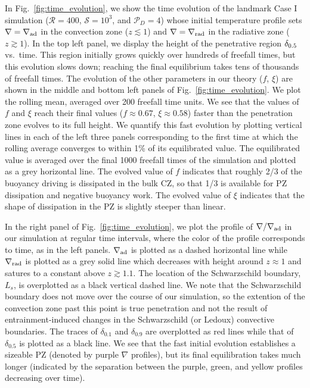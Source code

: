 \documentclass[twocolumn]{aastex631}
\newcommand{\gradrad}{\ensuremath{\nabla_{\rm{rad}}}}
\newcommand{\gradad}{\ensuremath{\nabla_{\rm{ad}}}}
\newcommand{\justgrad}{\ensuremath{\nabla}}
\newcommand{\mP}{\ensuremath{\mathcal{P}}}
\newcommand{\mR}{\ensuremath{\mathcal{R}}}
\newcommand{\mS}{\ensuremath{\mathcal{S}}}
\begin{document}
In Fig.~\ref{fig:time_evolution}, we show the time evolution of the landmark Case I simulation ($\mR = 400$, $\mS = 10^3$, and $\mP_D = 4$) whose initial temperature profile sets $\justgrad = \gradad$ in the convection zone ($z \lesssim 1$) and $\justgrad = \gradrad$ in the radiative zone ($z \gtrsim 1$).
In the top left panel, we display the height of the penetrative region $\delta_{\rm{0.5}}$ vs.~time.
This region initially grows quickly over hundreds of freefall times, but this evolution slows down; reaching the final equilibrium takes tens of thousands of freefall times.
The evolution of the other parameters in our theory ($f$, $\xi$) are shown in the middle and bottom left panels of Fig.~\ref{fig:time_evolution}.
We plot the rolling mean, averaged over 200 freefall time units. 
We see that the values of $f$ and $\xi$ reach their final values ($f \approx 0.67$, $\xi \approx 0.58$) faster than the penetration zone evolves to its full height.
We quantify this fast evolution by plotting vertical lines in each of the left three panels corresponding to the first time at which the rolling average converges to within 1\% of its equilibrated value.
The equilibrated value is averaged over the final 1000 freefall times of the simulation and plotted as a grey horizontal line.
The evolved value of $f$ indicates that roughly 2/3 of the buoyancy driving is dissipated in the bulk CZ, so that 1/3 is available for PZ dissipation and negative buoyancy work.
The evolved value of $\xi$ indicates that the shape of dissipation in the PZ is slightly steeper than linear.

In the right panel of Fig.~\ref{fig:time_evolution}, we plot the profile of $\justgrad/\gradad$ in our simulation at regular time intervals, where the color of the profile corresponds to time, as in the left panels.
$\gradad$ is plotted as a dashed horizontal line while $\gradrad$ is plotted as a grey solid line which decreases with height around $z \approx 1$ and satures to a constant above $z \gtrsim 1.1$.
The location of the Schwarzschild boundary, $L_s$, is overplotted as a black vertical dashed line.
We note that the Schwarzschild boundary does not move over the course of our simulation, so the extention of the convection zone past this point is true penetration and not the result of entrainment-induced changes in the Schwarzschild (or Ledoux) convective boundaries.
The traces of $\delta_{0.1}$ and $\delta_{0.9}$ are overplotted as red lines while that of $\delta_{0.5}$ is plotted as a black line.
We see that the fast initial evolution establishes a sizeable PZ (denoted by purple $\justgrad$ profiles), but its final equilibration takes much longer (indicated by the separation between the purple, green, and yellow profiles decreasing over time).
\end{document}
